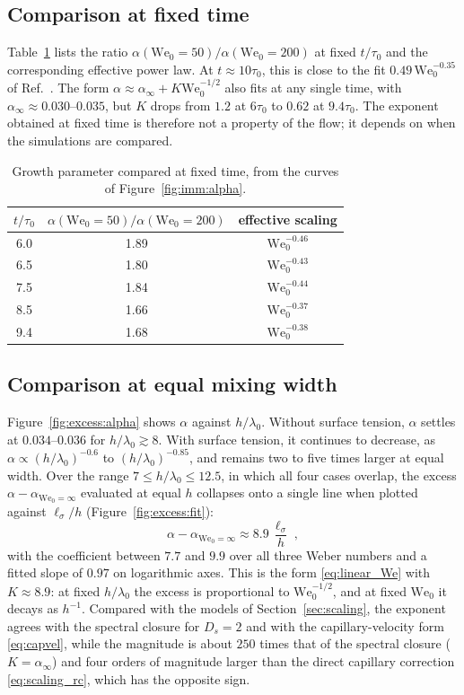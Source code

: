 \documentclass[11pt]{article}
\numberwithin{equation}{section}
\newcommand{\We}{\mathrm{We}_0}
\newcommand{\ls}{\ell_\sigma}
\begin{document}
\subsection{Comparison at fixed time}\label{sec:sims:fixed}
Table~\ref{tab:fixed_time} lists the ratio $\alpha(\We {=} 50)/\alpha(\We {=} 200)$ at fixed $t/\tau_0$ and the corresponding effective power law. At $t \approx 10 \tau_0$, this is close to the fit $0.49 \, \We^{-0.35}$ of Ref.~\cite{Walker2026}. The form $\alpha \approx \alpha_\infty + K \We^{-1/2}$ also fits at any single time, with $\alpha_\infty \approx 0.030$--$0.035$, but $K$ drops from $1.2$ at $6 \tau_0$ to $0.62$ at $9.4 \tau_0$. The exponent obtained at fixed time is therefore not a property of the flow; it depends on when the simulations are compared.
\begin{table}[h!]
\centering
\caption{Growth parameter compared at fixed time, from the curves of Figure~\ref{fig:imm:alpha}.}
\label{tab:fixed_time}
\begin{tabular}{ccc}
\toprule
$t/\tau_0$ & $\alpha(\We {=} 50)/\alpha(\We {=} 200)$ & effective scaling\\
\midrule
6.0 & 1.89 & $\We^{-0.46}$\\
6.5 & 1.80 & $\We^{-0.43}$\\
7.5 & 1.84 & $\We^{-0.44}$\\
8.5 & 1.66 & $\We^{-0.37}$\\
9.4 & 1.68 & $\We^{-0.38}$\\
\bottomrule
\end{tabular}
\end{table}

\subsection{Comparison at equal mixing width}\label{sec:sims:width}
Figure~\ref{fig:excess:alpha} shows $\alpha$ against $h/\lambda_0$. Without surface tension, $\alpha$ settles at $0.034$--$0.036$ for $h/\lambda_0 \gtrsim 8$. With surface tension, it continues to decrease, as $\alpha \propto (h/\lambda_0)^{-0.6}$ to $(h/\lambda_0)^{-0.85}$, and remains two to five times larger at equal width. Over the range $7 \le h/\lambda_0 \le 12.5$, in which all four cases overlap, the excess $\alpha - \alpha_{\We = \infty}$ evaluated at equal $h$ collapses onto a single line when plotted against $\ls/h$ (Figure~\ref{fig:excess:fit}):
\begin{equation}\label{eq:excess_fit}
\alpha - \alpha_{\We = \infty} \approx 8.9 \, \frac{\ls}{h} \;,
\end{equation}
with the coefficient between $7.7$ and $9.9$ over all three Weber numbers and a fitted slope of $0.97$ on logarithmic axes. This is the form \eqref{eq:linear_We} with $K \approx 8.9$: at fixed $h/\lambda_0$ the excess is proportional to $\We^{-1/2}$, and at fixed $\We$ it decays as $h^{-1}$. Compared with the models of Section~\ref{sec:scaling}, the exponent agrees with the spectral closure for $D_s = 2$ and with the capillary-velocity form \eqref{eq:capvel}, while the magnitude is about $250$ times that of the spectral closure ($K = \alpha_\infty$) and four orders of magnitude larger than the direct capillary correction \eqref{eq:scaling_rc}, which has the opposite sign.
\end{document}
